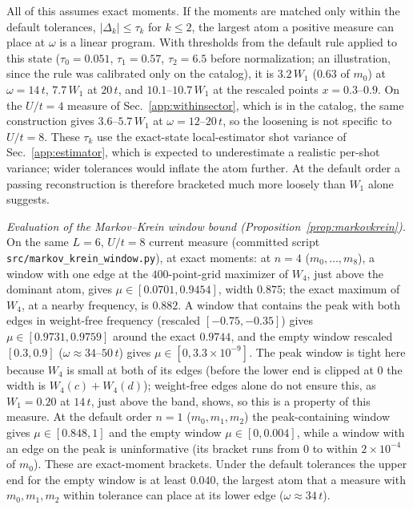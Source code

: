 \documentclass[aps,prb,onecolumn,superscriptaddress,longbibliography,floatfix]{revtex4-2}
\begin{document}
All of this assumes exact moments. If the moments are matched only within the default tolerances, $|\Delta_k|\le\tau_k$ for $k\le2$, the largest atom a positive measure can place at $\omega$ is a linear program. With thresholds from the default rule applied to this state ($\tau_0=0.051$, $\tau_1=0.57$, $\tau_2=6.5$ before normalization; an illustration, since the rule was calibrated only on the catalog), it is $3.2\,W_1$ ($0.63$ of $m_0$) at $\omega=14\,t$, $7.7\,W_1$ at $20\,t$, and $10.1$--$10.7\,W_1$ at the rescaled points $x=0.3$--$0.9$. On the $U/t=4$ measure of Sec.~\ref{app:withinsector}, which is in the catalog, the same construction gives $3.6$--$5.7\,W_1$ at $\omega=12$--$20\,t$, so the loosening is not specific to $U/t=8$. These $\tau_k$ use the exact-state local-estimator shot variance of Sec.~\ref{app:estimator}, which is expected to underestimate a realistic per-shot variance; wider tolerances would inflate the atom further. At the default order a passing reconstruction is therefore bracketed much more loosely than $W_1$ alone suggests.

\emph{Evaluation of the Markov--Krein window bound (Proposition~\ref{prop:markovkrein}).} On the same $L=6$, $U/t=8$ current measure (committed script \texttt{src/\allowbreak markov\_krein\_window.py}), at exact moments: at $n=4$ ($m_0,\dots,m_8$), a window with one edge at the $400$-point-grid maximizer of $W_4$, just above the dominant atom, gives $\mu\in[0.0701,0.9454]$, width $0.875$; the exact maximum of $W_4$, at a nearby frequency, is $0.882$. A window that contains the peak with both edges in weight-free frequency (rescaled $[-0.75,-0.35]$) gives $\mu\in[0.9731,0.9759]$ around the exact $0.9744$, and the empty window rescaled $[0.3,0.9]$ ($\omega\approx34$--$50\,t$) gives $\mu\in[0,3.3\times10^{-9}]$. The peak window is tight here because $W_4$ is small at both of its edges (before the lower end is clipped at $0$ the width is $W_4(c)+W_4(d)$); weight-free edges alone do not ensure this, as $W_1=0.20$ at $14\,t$, just above the band, shows, so this is a property of this measure. At the default order $n=1$ ($m_0,m_1,m_2$) the peak-containing window gives $\mu\in[0.848,1]$ and the empty window $\mu\in[0,0.004]$, while a window with an edge on the peak is uninformative (its bracket runs from $0$ to within $2\times10^{-4}$ of $m_0$). These are exact-moment brackets. Under the default tolerances the upper end for the empty window is at least $0.040$, the largest atom that a measure with $m_0,m_1,m_2$ within tolerance can place at its lower edge ($\omega\approx34\,t$).
\end{document}

